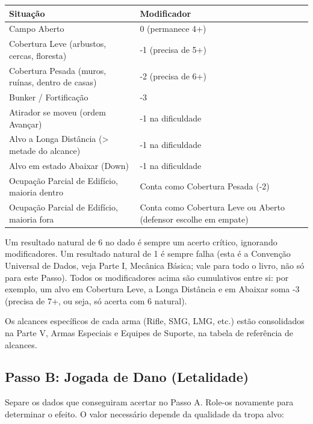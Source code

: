 \begin{center}
\begin{tabular}{p{7cm}p{6.3cm}}
\toprule
Situação & Modificador \\
\midrule
Campo Aberto & 0 (permanece 4+) \\
Cobertura Leve (arbustos, cercas, floresta) & -1 (precisa de 5+) \\
Cobertura Pesada (muros, ruínas, dentro de casas) & -2 (precisa de 6+) \\
Bunker / Fortificação & -3 \\
Atirador se moveu (ordem Avançar) & -1 na dificuldade \\
Alvo a Longa Distância (> metade do alcance) & -1 na dificuldade \\
Alvo em estado Abaixar (Down) & -1 na dificuldade \\
Ocupação Parcial de Edifício, maioria dentro & Conta como Cobertura Pesada (-2) \\
Ocupação Parcial de Edifício, maioria fora & Conta como Cobertura Leve ou Aberto (defensor escolhe em empate) \\
\bottomrule
\end{tabular}
\end{center}

\begin{nota}
Um resultado natural de 6 no dado é sempre um acerto crítico, ignorando modificadores. Um resultado natural de 1 é sempre falha (esta é a Convenção Universal de Dados, veja Parte I, Mecânica Básica; vale para todo o livro, não só para este Passo). Todos os modificadores acima são cumulativos entre si: por exemplo, um alvo em Cobertura Leve, a Longa Distância e em Abaixar soma -3 (precisa de 7+, ou seja, só acerta com 6 natural).
\end{nota}

\begin{nota}
Os alcances específicos de cada arma (Rifle, SMG, LMG, etc.) estão consolidados na Parte V, Armas Especiais e Equipes de Suporte, na tabela de referência de alcances.
\end{nota}

\subsection{Passo B: Jogada de Dano (Letalidade)}

Separe os dados que conseguiram acertar no Passo A. Role-os novamente para determinar o efeito. O valor necessário depende da qualidade da tropa alvo:

